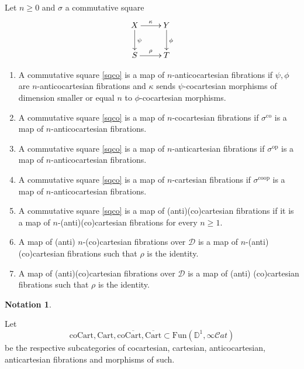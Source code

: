 \documentclass[10pt,oneside]{article}
\numberwithin{equation}{section} %
\numberwithin{figure}{section} %
\theoremstyle{plain}
\theoremstyle{definition}
\newtheorem{notation}[thm]{Notation}
\newcommand{\bD}{{\mathbb D}}
\newcommand{\mD}{{\mathcal D}}
\newcommand{\op}{\mathrm{op}}
\newcommand{\co}{\mathrm{co}}
\newcommand{\Fun}{\mathrm{Fun}}
\newcommand{\Cart}{{\mathrm{Cart}}}
\newcommand{\coop}{\mathrm{coop}}
\newcommand{\coCart}{{\mathrm{coCart}}}
\newcommand{\scat}{\mathcal{C}\mathit{at}}
\begin{document}
\begin{definition}Let $n \geq 0$ and $\sigma$ a commutative square
\begin{equation}\label{sqco}
\begin{xy}
\xymatrix{
X \ar[d]^\psi \ar[r]^\kappa
& Y \ar[d]^\phi
\\ 
S \ar[r]^\rho & T
}
\end{xy}\end{equation}


\begin{enumerate}[\normalfont(1)]\setlength{\itemsep}{-2pt}
\item A commutative square \ref{sqco} is a map of $n$-anticocartesian fibrations if $\psi, \phi$ are $n$-anticocartesian fibrations and $\kappa$ sends $\psi$-cocartesian morphisms of dimension smaller or equal $n$ to $\phi$-cocartesian morphisms.

\item A commutative square \ref{sqco}
is a map of $n$-cocartesian fibrations if $\sigma^\co$ is a map of $n$-anticocartesian fibrations.

\item A commutative square \ref{sqco}
is a map of $n$-anticartesian fibrations if $\sigma^\op$ is a map of $n$-anticocartesian fibrations.

\item A commutative square \ref{sqco}
is a map of $n$-cartesian fibrations if $\sigma^\coop$ is a map of $n$-anticocartesian fibrations.

\item A commutative square \ref{sqco}
is a map of (anti)(co)cartesian fibrations if it is a map of
$n$-(anti)(co)cartesian fibrations for every $n \geq 1.$

\item A map of (anti) $n$-(co)cartesian fibrations over $\mD$ is a map of $n$-(anti)(co)cartesian fibrations such that $\rho$ is the identity.

\item A map of (anti)(co)cartesian fibrations over $\mD$ is a map of (anti) (co)cartesian fibrations such that $\rho$ is the identity.
\end{enumerate}

\end{definition}



\begin{notation}\label{notfib1}

Let $$\coCart, \Cart, \co\overline{\Cart}, \overline{\Cart} \subset \Fun(\bD^1,\infty\scat)$$
be the respective subcategories of cocartesian, cartesian, anticocartesian, anticartesian fibrations and morphisms of such. 

\end{notation}
\end{document}
